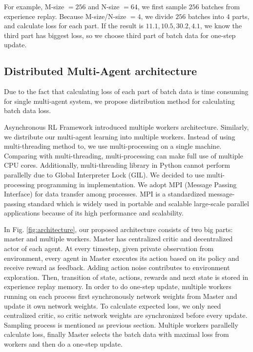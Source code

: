 \documentclass[11pt,twocolumn]{jarticle} %
\begin{document}
For example, M-size $= 256$ and N-size $= 64$, we first sample $256$ batches from experience replay. Because M-size/N-size $= 4$, we divide $256$ batches into $4$ parts, and calculate loss for each part. If the result is {$11.1, 10.5, 30.2, 4.1$}, we know the third part has biggest loss, so we choose third part of batch data for one-step update. 

\subsection{Distributed Multi-Agent architecture}

Due to the fact that calculating loss of each part of batch data is time consuming for single multi-agent system, we propose distribution method for calculating batch data loss. \par 
Asynchronous RL Framework\cite{a3c} introduced multiple workers architecture. Similarly, we distribute our multi-agent learning into multiple workers. Instead of using multi-threading method to, we use multi-processing on a single machine. Comparing with multi-threading, multi-processing can make full use of multiple CPU cores. Additionally, multi-threading library in Python cannot perform parallelly due to Global Interpreter Lock (GIL). We decided to use multi-processing programming in implementation. We adopt MPI (Message Passing Interface) for data transfer among processes. MPI is a standardized message-passing standard which is widely used in portable and scalable large-scale parallel applications because of its high performance and scalability. \par
In Fig. \ref{fig:architecture}, our proposed architecture consists of two big parts: master and multiple workers. Master has centralized critic and decentralized actor of each agent. At every timestep, given private observation from environment, every agent in Master executes its action based on its policy and receive reward as feedback. Adding action noise contributes to environment exploration. Then, transition of state, actions, rewards and next state is stored in experience replay memory. In order to do one-step update, multiple workers running on each process first synchronously network weights from Master and update it own network weights. To calculate expected loss, we only need centralized critic, so critic network weights are synchronized before every update. Sampling process is mentioned as previous section. Multiple workers parallelly calculate loss, finally Master selects the batch data with maximal loss from workers and then do a one-step update. \par
\end{document}
